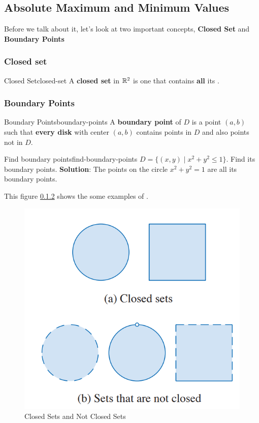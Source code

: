 \documentclass[math,code]{amznotes}
\theoremstyle{remark}
\begin{document}
\subsection{Absolute Maximum and Minimum Values}
Before we talk about it, let's look at two important concepts, {\color{red} \textbf{Closed Set}} and {\color{red} \textbf{Boundary Points}}
\subsubsection{Closed set}
\begin{dfnbox}{Closed Set}{closed-set}
    A {\color{red} \textbf{closed set}} in $\mathbb{R}^2$ is one that contains {\color{red} \textbf{all}} its .
\end{dfnbox}
\subsubsection{Boundary Points}
\begin{dfnbox}{Boundary Points}{boundary-points}
    A {\color{red} \textbf{boundary point}} of $D$ is a point $(a,b)$ such that {\color{red} \textbf{every disk}} with center $(a,b)$ contains points in $D$ and also points not in $D$.
\end{dfnbox}
\begin{exbox}{Find boundary points}{find-boundary-points}
    $D=\{(x,y)\mid x^2+y^2 \leq 1\}$. Find its boundary points. \newline
    {\color{blue} \textbf{Solution}}: The points on the circle $x^2+y^2=1$ are all its boundary points.
\end{exbox}
This figure \ref{} shows the some examples of .
\begin{figure}[H]
    \centering
    \includegraphics[width=0.5\linewidth]{images/closed-set-examples.png}
    \caption{Closed Sets and Not Closed Sets}
    \label{fig:closed-sets-example}
\end{figure}
\end{document}
